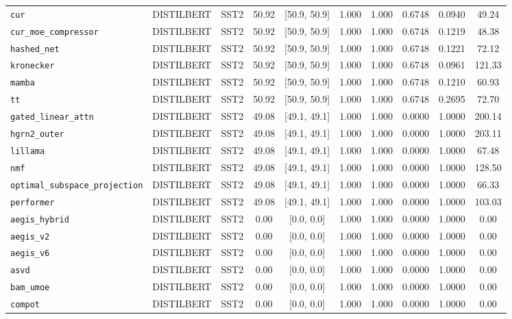 \begin{table}[t]
\begin{tabular}{l l l c c c c c c c}
\texttt{cur} & DISTILBERT & SST2 & 50.92 & [50.9, 50.9] & 1.000 & 1.000 & 0.6748 & 0.0940 & 49.24 \\
\texttt{cur\_moe\_compressor} & DISTILBERT & SST2 & 50.92 & [50.9, 50.9] & 1.000 & 1.000 & 0.6748 & 0.1219 & 48.38 \\
\texttt{hashed\_net} & DISTILBERT & SST2 & 50.92 & [50.9, 50.9] & 1.000 & 1.000 & 0.6748 & 0.1221 & 72.12 \\
\texttt{kronecker} & DISTILBERT & SST2 & 50.92 & [50.9, 50.9] & 1.000 & 1.000 & 0.6748 & 0.0961 & 121.33 \\
\texttt{mamba} & DISTILBERT & SST2 & 50.92 & [50.9, 50.9] & 1.000 & 1.000 & 0.6748 & 0.1210 & 60.93 \\
\texttt{tt} & DISTILBERT & SST2 & 50.92 & [50.9, 50.9] & 1.000 & 1.000 & 0.6748 & 0.2695 & 72.70 \\
\texttt{gated\_linear\_attn} & DISTILBERT & SST2 & 49.08 & [49.1, 49.1] & 1.000 & 1.000 & 0.0000 & 1.0000 & 200.14 \\
\texttt{hgrn2\_outer} & DISTILBERT & SST2 & 49.08 & [49.1, 49.1] & 1.000 & 1.000 & 0.0000 & 1.0000 & 203.11 \\
\texttt{lillama} & DISTILBERT & SST2 & 49.08 & [49.1, 49.1] & 1.000 & 1.000 & 0.0000 & 1.0000 & 67.48 \\
\texttt{nmf} & DISTILBERT & SST2 & 49.08 & [49.1, 49.1] & 1.000 & 1.000 & 0.0000 & 1.0000 & 128.50 \\
\texttt{optimal\_subspace\_projection} & DISTILBERT & SST2 & 49.08 & [49.1, 49.1] & 1.000 & 1.000 & 0.0000 & 1.0000 & 66.33 \\
\texttt{performer} & DISTILBERT & SST2 & 49.08 & [49.1, 49.1] & 1.000 & 1.000 & 0.0000 & 1.0000 & 103.03 \\
\texttt{aegis\_hybrid} & DISTILBERT & SST2 & 0.00 & [0.0, 0.0] & 1.000 & 1.000 & 0.0000 & 1.0000 & 0.00 \\
\texttt{aegis\_v2} & DISTILBERT & SST2 & 0.00 & [0.0, 0.0] & 1.000 & 1.000 & 0.0000 & 1.0000 & 0.00 \\
\texttt{aegis\_v6} & DISTILBERT & SST2 & 0.00 & [0.0, 0.0] & 1.000 & 1.000 & 0.0000 & 1.0000 & 0.00 \\
\texttt{asvd} & DISTILBERT & SST2 & 0.00 & [0.0, 0.0] & 1.000 & 1.000 & 0.0000 & 1.0000 & 0.00 \\
\texttt{bam\_umoe} & DISTILBERT & SST2 & 0.00 & [0.0, 0.0] & 1.000 & 1.000 & 0.0000 & 1.0000 & 0.00 \\
\texttt{compot} & DISTILBERT & SST2 & 0.00 & [0.0, 0.0] & 1.000 & 1.000 & 0.0000 & 1.0000 & 0.00 \\

\end{tabular}
\end{table}
